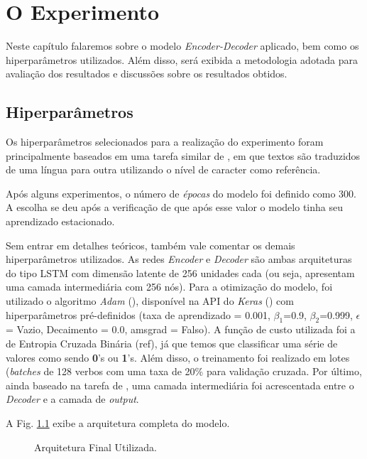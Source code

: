 \chapter{O Experimento}
\label{ch:07}

Neste capítulo falaremos sobre o modelo \textit{Encoder-Decoder} aplicado, bem como os hiperparâmetros utilizados. Além disso, será exibida a metodologia adotada para avaliação dos resultados e discussões sobre os resultados obtidos.

\section{Hiperparâmetros}
\label{sec:treinamento}

Os hiperparâmetros selecionados para a realização do experimento foram principalmente baseados em uma tarefa similar de \cite{cholletseq2seq}, em que textos são traduzidos de uma língua para outra utilizando o nível de caracter como referência.

Após alguns experimentos, o número de \textit{épocas} do modelo foi definido como 300. A escolha se deu após a verificação de que após esse valor o modelo tinha seu aprendizado estacionado.

Sem entrar em detalhes teóricos, também vale comentar os demais hiperparâmetros utilizados. As redes \textit{Encoder} e \textit{Decoder} são ambas arquiteturas do tipo LSTM com dimensão latente de 256 unidades cada (ou seja, apresentam uma camada intermediária com 256 nós). Para a otimização do modelo, foi utilizado o algoritmo \textit{Adam} (\cite{adam:2014}), disponível na API do \textit{Keras} (\cite{chollet2015keras}) com hiperparâmetros pré-definidos (taxa de aprendizado = 0.001, $\beta_{1}$=0.9, $\beta_{2}$=0.999, $\epsilon$ = Vazio, Decaimento = 0.0, amsgrad = Falso). A função de custo utilizada foi a de Entropia Cruzada Binária (ref), já que temos que classificar uma série de valores como sendo \textbf{0}'s ou \textbf{1}'s. Além disso, o treinamento foi realizado em lotes (\textit{batches} de 128 verbos com uma taxa de 20\% para validação cruzada. Por último, ainda baseado na tarefa de \cite{cholletseq2seq}, uma camada intermediária foi acrescentada entre o \textit{Decoder} e a camada de \textit{output}.

A Fig. \ref{fig:encoder-decoder} exibe a arquitetura completa do modelo.

\begin{figure}[!htb]
\caption{\label{fig:encoder-decoder} Arquitetura Final Utilizada.}
\end{figure}

